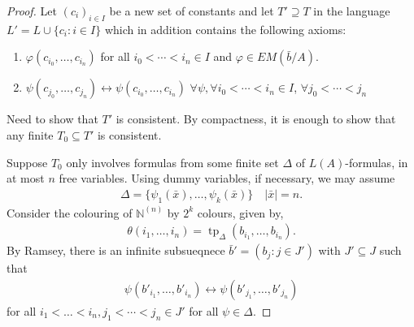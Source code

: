 \documentclass{article}
\DeclareMathOperator{\tp}{tp}
\begin{document}
\begin{proof}
  Let $(c_i)_{i \in I}$ be a new set of constants and let $T' \supseteq T$ in the language $L' = L \cup \{c_i : i \in I\}$ which in addition contains the following axioms:
  \begin{enumerate}
    \item $\varphi(c_{i_0}, \dotsc, c_{i_n})$ for all $i_0  < \dotsb < i_n \in I$ and $\varphi \in EM(\bar{b}/A)$.
    \item $\psi(c_{j_0}, \dotsc, c_{j_n}) \leftrightarrow \psi(c_{i_0}, \dotsc, c_{i_n})$ $\forall \psi, \forall i_0 < \dotsb < i_n \in I$, $\forall j_0 < \dotsb < j_n$
  \end{enumerate}
  Need to show that $T'$ is consistent. By compactness, it is enough to show that any finite $T_0 \subseteq T'$ is consistent.

  Suppose $T_0$ only involves formulas from some finite set $\Delta$ of $L(A)$-formulas, in at most $n$ free variables.
  Using dummy variables, if necessary, we may assume
  \begin{align*}
    \Delta = \{\psi_1(\bar{x}), \dotsc, \psi_k(\bar{x})\} \quad |\bar{x}| = n.
  \end{align*}
  Consider the colouring of $\mathbb{N}^{(n)}$ by $2^k$ colours, given by,
  \begin{align*}
    \theta(i_1, \dotsc, i_n) = \tp_\Delta(b_{i_1}, \dotsc, b_{i_n}).
  \end{align*}
  By Ramsey, there is an infinite subsueqnece $\bar{b}' = (b_j : j \in J')$ with $J' \subseteq J$ such that
  \begin{align*}
    \psi(b'_{i_1}, \dotsc, b'_{i_n}) \leftrightarrow \psi(b'_{j_1}, \dotsc, b'_{j_n})
  \end{align*}
  for all $i_1 < \dotsc < i_n, j_1 < \dotsb < j_n \in J'$ for all $\psi \in \Delta$.
\end{proof}
\end{document}

